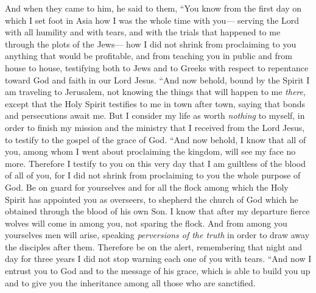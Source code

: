 \begin{biblechapter}
\verse And when they came to him, he said to them, “You know from the first day on which I set foot in Asia how I was the whole time with you—
\verse serving the Lord with all humility and with tears, and with the trials that happened to me through the plots of the Jews—
\verse how I did not shrink from proclaiming to you anything that would be profitable, and from teaching you in public and from house to house,
\verse testifying both to Jews and to Greeks with respect to repentance toward God and faith in our Lord Jesus.
\verse “And now behold, bound by the Spirit I am traveling to Jerusalem, not knowing the things that will happen to me \textit{there},
\verse except that the Holy Spirit testifies to me in town after town, saying that bonds and persecutions await me.
\verse But I consider my life as worth \textit{nothing} to myself, in order to finish my mission and the ministry that I received from the Lord Jesus, to testify to the gospel of the grace of God.
\verse “And now behold, I know that all of you, among whom I went about proclaiming the kingdom, will see my face no more.
\verse Therefore I testify to you on this very day that I am guiltless of the blood of all of you,
\verse for I did not shrink from proclaiming to you the whole purpose of God.
\verse Be on guard for yourselves and for all the flock among which the Holy Spirit has appointed you as overseers, to shepherd the church of God which he obtained through the blood of his own Son.
\verse I know that after my departure fierce wolves will come in among you, not sparing the flock.
\verse And from among you yourselves men will arise, speaking \textit{perversions of the truth} in order to draw away the disciples after them.
\verse Therefore be on the alert, remembering that night and day for three years I did not stop warning each one of you with tears.
\verse “And now I entrust you to God and to the message of his grace, which is able to build you up and to give you the inheritance among all those who are sanctified.

\end{biblechapter}
